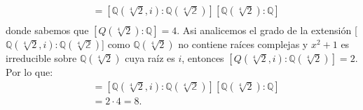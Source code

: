 \begin{solucion}
\begin{align*}
    [L:\mathbb{Q}] &= [\mathbb{Q}(\sqrt[4]{2}, i):\mathbb{Q(\sqrt[4]{2})}][\mathbb{Q}(\sqrt[4]{2}):\mathbb{Q}] \\
\end{align*}
donde sabemos que \([Q(\sqrt[4]{2}):\mathbb{Q}]=4\). Asi analicemos el grado de la extensión [\(\mathbb{Q}(\sqrt[4]{2}, i):\mathbb{Q(\sqrt[4]{2})}\)] como $\mathbb Q(\sqrt[4]{2})$  no contiene raíces complejas y $x^2 + 1$ es irreducible sobre \(\mathbb{Q}(\sqrt[4]{2})\) cuya raíz es \(i\), entonces \([Q(\sqrt[4]{2}, i):\mathbb{Q}(\sqrt[4]{2})]=2\). Por lo que:
\begin{align*}
    [L:\mathbb{Q}] &= [\mathbb{Q}(\sqrt[4]{2}, i):\mathbb{Q(\sqrt[4]{2})}][\mathbb{Q}(\sqrt[4]{2}):\mathbb{Q}] \\
    &= 2 \cdot 4 = 8.
\end{align*}
\end{solucion}
